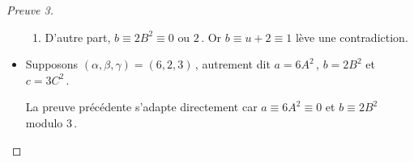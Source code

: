 \begin{proof}[Preuve 3]
\begin{itemize}
\begin{enumerate}
			\item D'autre part, $b \equiv 2 B^2 \equiv \text{$0$ ou $2$}$\,.
			Or $b \equiv u + 2 \equiv 1$ lève une contradiction.
		\end{enumerate}
		
		
		\item Supposons $(\alpha, \beta, \gamma) = (6, 2, 3)$\,, 
		autrement dit 
		$a = 6 A^2$\,, $b = 2 B^2$ et $c = 3 C^2$\,.
		
		\smallskip
		\noindent
		La preuve précédente s'adapte directement car $a \equiv 6 A^2 \equiv 0$ et $b \equiv 2 B^2$ modulo $3$\,.
	\end{itemize}
\end{proof}

